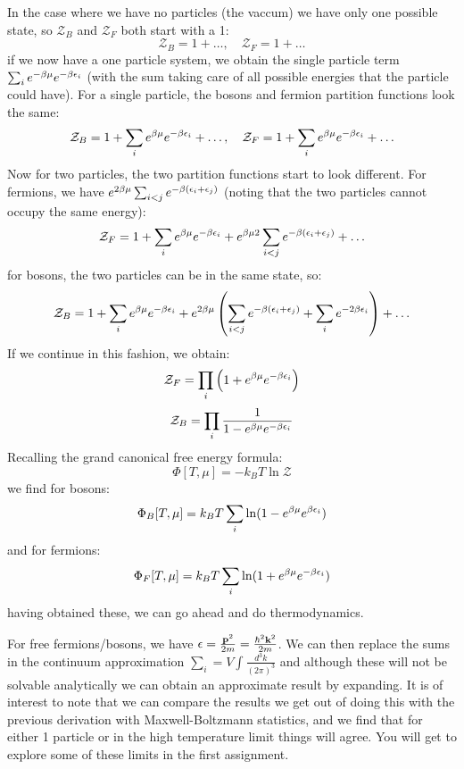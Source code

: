 In the case where we have no particles (the vaccum) we have only one possible state, so $\mathcal{Z}_{B}$ and $\mathcal{Z}_{F}$ both start with a 1:
\begin{equation}
    \mathcal{Z}_{B} = 1 + \ldots, \quad \mathcal{Z}_{F} = 1 + \ldots
\end{equation}
if we now have a one particle system, we obtain the single particle term $\sum_i e^{-\beta \mu}e^{-\beta \epsilon_i}$ (with the sum taking care of all possible energies that the particle could have). For a single particle, the bosons and fermion partition functions look the same:
\begin{equation}
    \mathcal{Z}_{B} = 1 + \sum_i e^{\beta \mu}e^{-\beta \epsilon_i} + \ldots, \quad \mathcal{Z}_{F} = 1 + \sum_i e^{\beta \mu}e^{-\beta \epsilon_i} + \ldots
\end{equation}
Now for two particles, the two partition functions start to look different. For fermions, we have $e^{2\beta\mu}\sum_{i < j} e^{-\beta(\epsilon_i + \epsilon_j)}$ (noting that the two particles cannot occupy the same energy):
\begin{equation}
    \mathcal{Z}_F = 1 + \sum_i e^{\beta \mu}e^{-\beta \epsilon_i} + e^{\beta\mu 2}\sum_{i < j} e^{-\beta(\epsilon_i + \epsilon_j)} + \ldots
\end{equation}
for bosons, the two particles can be in the same state, so:
\begin{equation}
    \mathcal{Z}_B = 1 + \sum_i e^{\beta\mu}e^{-\beta \epsilon_i} + e^{2\beta\mu}\left(\sum_{i < j}e^{-\beta(\epsilon_i + \epsilon_j)} + \sum_i e^{-2\beta\epsilon_i}\right) + \ldots
\end{equation}
If we continue in this fashion, we obtain:
\begin{equation}
    \mathcal{Z}_F = \prod_i\left(1 + e^{\beta \mu}e^{-\beta \epsilon_i}\right)
\end{equation}
\begin{equation}
    \mathcal{Z}_B = \prod_i \frac{1}{1 - e^{\beta\mu}e^{-\beta\epsilon_i}}
\end{equation}
Recalling the grand canonical free energy formula:
\begin{equation}
    \Phi[T, \mu] = -k_B T\ln \mathcal{Z} 
\end{equation}
we find for bosons:
\begin{equation}
    \Phi_B[T, \mu] = k_B T\sum_i \ln(1 - e^{\beta\mu}e^{\beta\epsilon_i})
\end{equation}
and for fermions:
\begin{equation}
    \Phi_F[T, \mu] = k_B T\sum_i \ln(1 + e^{\beta\mu}e^{-\beta\epsilon_i})
\end{equation}
having obtained these, we can go ahead and do thermodynamics.

For free fermions/bosons, we have $\epsilon = \frac{\mathbf{p}^2}{2m} = \frac{\hbar^2\mathbf{k}^2}{2m}$. We can then replace the sums in the continuum approximation $\sum_i = V \int \frac{d^3k}{(2\pi)^3}$ and although these will not be solvable analytically we can obtain an approximate result by expanding. It is of interest to note that we can compare the results we get out of doing this with the previous derivation with Maxwell-Boltzmann statistics, and we find that for either 1 particle or in the high temperature limit things will agree. You will get to explore some of these limits in the first assignment.
